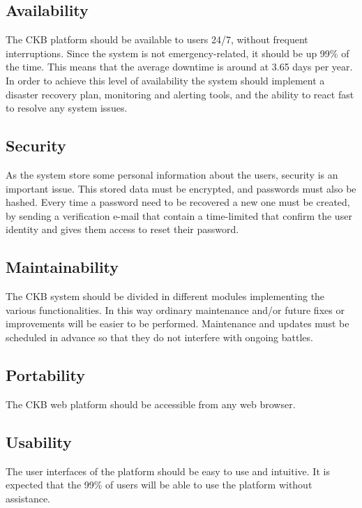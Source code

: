 \subsection{Availability}
The CKB platform should be available to users 24/7, without frequent interruptions. 
Since the system is not emergency-related, it should be up 99\% of the time.
This means that the average downtime is around at 3.65 days per year. \newline
In order to achieve this level of availability the system should implement a disaster recovery plan, monitoring and alerting tools, and the ability to react fast to resolve any system issues.

\subsection{Security}
As the system store some personal information about the users, security is an important issue. This stored data must be encrypted, and passwords must also be hashed. \newline
Every time a password need to be recovered a new one must be created, by sending a verification e-mail that contain a time-limited that confirm the user identity and gives them access to reset their password.

\subsection{Maintainability}
The CKB system should be divided in different modules implementing the various functionalities. In this way ordinary maintenance and/or future fixes or improvements will be easier to be performed. \newline
Maintenance and updates must be scheduled in advance so that they do not interfere with ongoing battles. 

\subsection{Portability}
The CKB web platform should be accessible from any web browser.

\subsection{Usability}
The user interfaces of the platform should be easy to use and intuitive. It is expected that the 99\% of users will be able to use the platform without assistance.
